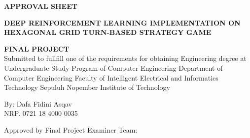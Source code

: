 \begin{center}
	\large
  \textbf{APPROVAL SHEET}
\end{center}

\thispagestyle{empty}

\begin{center}
  \textbf{DEEP REINFORCEMENT LEARNING IMPLEMENTATION ON HEXAGONAL GRID TURN-BASED STRATEGY GAME}
\end{center}

\begingroup
  \small
  

  \begin{center}
    \textbf{FINAL PROJECT}
    \\Submitted to fullfill one of the requirements for obtaining Engineering degree at Undergraduate Study Program of Computer Engineering Department of Computer Engineering Faculty of Intelligent Electrical and Informatics Technology Sepuluh Nopember Institute of Technology
  \end{center}


  \begin{center}
    By: Dafa Fidini Asqav
    \\NRP. 0721 18 4000 0035
  \end{center}



  \begin{center}
    Approved by Final Project Examiner Team:
  \end{center}


  \begingroup
    \setlength{\tabcolsep}{0pt}

